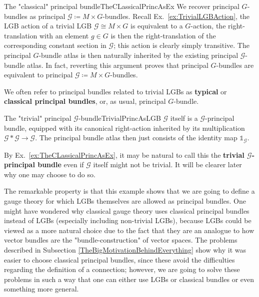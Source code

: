 \documentclass[a4paper,oneside,11pt,bibliography=totoc]{scrartcl}
\theoremstyle{plain}
\theoremstyle{remark}
\theoremstyle{definition}
\begin{document}
\begin{examples}{The "classical" principal bundle}{TheCLassicalPrincAsEx}
We recover principal $G$-bundles as principal $\mathcal{G} \coloneqq M \times G$-bundles. Recall Ex.\ \ref{ex:TrivialLGBAction}, the LGB action of a trivial LGB $\mathcal{G} \cong M \times G$ is equivalent to a $G$-action, the right-translation with an element $g \in G$ is then the right-translation of the corresponding constant section in $\mathcal{G}$; this action is clearly simply transitive. The principal $G$-bundle atlas is then naturally inherited by the existing principal $\mathcal{G}$-bundle atlas. In fact, reverting this argument proves that principal $G$-bundles are equivalent to principal $\mathcal{G} \coloneqq M \times G$-bundles.

We often refer to principal bundles related to trivial LGBs as \textbf{typical} or \textbf{classical principal bundles}, or, as usual, principal $G$-bundle. 
\end{examples}

\begin{examples}{The "trivial" principal $\mathcal{G}$-bundle}{TrivialPrincAsLGB}
$\mathcal{G}$ itself is a $\mathcal{G}$-principal bundle, equipped with its canonical right-action inherited by its multiplication $\mathcal{G}*\mathcal{G} \to \mathcal{G}$. The principal bundle atlas then just consists of the identity map $\mathds{1}_{\mathcal{G}}$.

By Ex.\ \ref{ex:TheCLassicalPrincAsEx}, it may be natural to call this the \textbf{trivial $\mathcal{G}$-principal bundle} even if $\mathcal{G}$ itself might not be trivial. It will be clearer later why one may choose to do so.

The remarkable property is that this example shows that we are going to define a gauge theory for which LGBs themselves are allowed as principal bundles. One might have wondered why classical gauge theory uses classical principal bundles instead of LGBs (especially including non-trivial LGBs), because LGBs could be viewed as a more natural choice due to the fact that they are an analogue to how vector bundles are the "bundle-construction" of vector spaces. The problems described in Subsection \ref{TheBigMotivationBehindEverything} show why it was easier to choose classical principal bundles, since these avoid the difficulties regarding the definition of a connection; however, we are going to solve these problems in such a way that one can either use LGBs or classical bundles or even something more general.
\end{examples}
\end{document}
